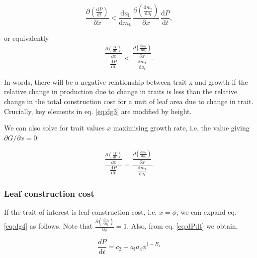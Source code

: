 \documentclass[12pt, a4paper]{article}
\begin{document}
\begin{equation}\label{eq:dg3}
\frac{\partial \left( \frac{ \textrm{d}P} {\textrm{d}t}\right)}{\partial x}
< \frac{\textrm{d}a_\textrm{l}} {\textrm{d}m_\textrm{t}}
\,  \frac{\partial \left(\frac{\textrm{d}m_\textrm{t}} {\textrm{d}a_\textrm{l}}\right)
}{\partial x} \, \frac{ \textrm{d}P} {\textrm{d}t},
\end{equation}

or equivalently
\begin{equation}\label{eq:dg4}
\frac{
\frac{\partial \left( \frac{ \textrm{d}P} {\textrm{d}t}\right)}{\partial x} }
{\frac{ \textrm{d}P} {\textrm{d}t}}
<
\frac{ \frac{\partial \left(\frac{\textrm{d}m_\textrm{t}} {\textrm{d}a_\textrm{l}}\right)
}{\partial x}}{\frac{\textrm{d}m_\textrm{t}} {\textrm{d}a_\textrm{l}}}.
\end{equation}

In words, there will be a negative relationship between trait x and growth if the
relative change in production due to change in traits is less than the relative change
in the total construction cost for a unit of leaf area due to change in trait. Crucially,
key elements in eq. \ref{eq:dg3} are modified by height.

We can also solve for trait values \(x\) maximising growth rate, i.e. the value
giving \(\partial G /\partial x = 0\):

\begin{equation}\label{eq:max}
\frac{
\frac{\partial \left( \frac{ \textrm{d}P} {\textrm{d}t}\right)}{\partial x} }
{\frac{ \textrm{d}P} {\textrm{d}t}}
=
\frac{ \frac{\partial \left(\frac{\textrm{d}m_\textrm{t}} {\textrm{d}a_\textrm{l}}\right)
}{\partial x}}{\frac{\textrm{d}m_\textrm{t}} {\textrm{d}a_\textrm{l}}}.
\end{equation}

\subsubsection{Leaf construction cost}

If the trait of interest is leaf-construction cost, i.e. \(x=\phi\), we can expand
eq. \ref{eq:dg4} as follows. Note that $\frac{\partial \left(\frac{\textrm{d}m_\textrm
{t}} {\textrm{d}a_\textrm{l}}\right)}{\partial \phi} = 1$. Also, from eq. \ref{eq:dPdt} we obtain,

\begin{equation}\label{eq:dPdt2}
\frac{dP}{\textrm{d}t} = c_2 - a_\textrm{l} a_4 \phi ^{1-B_4}
\end{equation}
\end{document}
